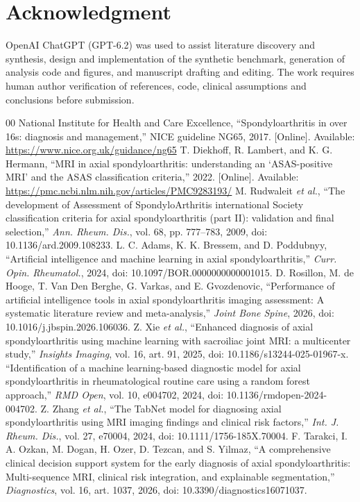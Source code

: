 \documentclass[conference]{IEEEtran}
\begin{document}
\section*{Acknowledgment}
OpenAI ChatGPT (GPT-6.2) was used to assist literature discovery and synthesis, design and implementation of the synthetic benchmark, generation of analysis code and figures, and manuscript drafting and editing. The work requires human author verification of references, code, clinical assumptions and conclusions before submission.
\begin{thebibliography}{00}
 National Institute for Health and Care Excellence, ``Spondyloarthritis in over 16s: diagnosis and management,'' NICE guideline NG65, 2017. [Online]. Available: \url{https://www.nice.org.uk/guidance/ng65}
 T. Diekhoff, R. Lambert, and K. G. Hermann, ``MRI in axial spondyloarthritis: understanding an `ASAS-positive MRI' and the ASAS classification criteria,'' 2022. [Online]. Available: \url{https://pmc.ncbi.nlm.nih.gov/articles/PMC9283193/}
 M. Rudwaleit \emph{et al.}, ``The development of Assessment of SpondyloArthritis international Society classification criteria for axial spondyloarthritis (part II): validation and final selection,'' \emph{Ann. Rheum. Dis.}, vol. 68, pp. 777--783, 2009, doi: 10.1136/ard.2009.108233.
 L. C. Adams, K. K. Bressem, and D. Poddubnyy, ``Artificial intelligence and machine learning in axial spondyloarthritis,'' \emph{Curr. Opin. Rheumatol.}, 2024, doi: 10.1097/BOR.0000000000001015.
 D. Rosillon, M. de Hooge, T. Van Den Berghe, G. Varkas, and E. Gvozdenovic, ``Performance of artificial intelligence tools in axial spondyloarthritis imaging assessment: A systematic literature review and meta-analysis,'' \emph{Joint Bone Spine}, 2026, doi: 10.1016/j.jbspin.2026.106036.
 Z. Xie \emph{et al.}, ``Enhanced diagnosis of axial spondyloarthritis using machine learning with sacroiliac joint MRI: a multicenter study,'' \emph{Insights Imaging}, vol. 16, art. 91, 2025, doi: 10.1186/s13244-025-01967-x.
 ``Identification of a machine learning-based diagnostic model for axial spondyloarthritis in rheumatological routine care using a random forest approach,'' \emph{RMD Open}, vol. 10, e004702, 2024, doi: 10.1136/rmdopen-2024-004702.
 Z. Zhang \emph{et al.}, ``The TabNet model for diagnosing axial spondyloarthritis using MRI imaging findings and clinical risk factors,'' \emph{Int. J. Rheum. Dis.}, vol. 27, e70004, 2024, doi: 10.1111/1756-185X.70004.
 F. Tarakci, I. A. Ozkan, M. Dogan, H. Ozer, D. Tezcan, and S. Yilmaz, ``A comprehensive clinical decision support system for the early diagnosis of axial spondyloarthritis: Multi-sequence MRI, clinical risk integration, and explainable segmentation,'' \emph{Diagnostics}, vol. 16, art. 1037, 2026, doi: 10.3390/diagnostics16071037.

\end{thebibliography}
\end{document}
